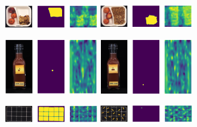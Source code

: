 \begin{figure}[H]
    \captionsetup[subfigure]{justification=centering}
    \centering
    \begin{subfigure}[b]{\textwidth}
        \centering
        \includegraphics[width=0.45\textwidth]{figures/appendix/appendix_main_ensemble/BB/image_prediction_128.png}
        \includegraphics[width=0.45\textwidth]{figures/appendix/appendix_main_ensemble/BB/image_prediction_272.png}

    \end{subfigure}
    \begin{subfigure}[b]{\textwidth}
        \centering
        \includegraphics[width=0.45\textwidth]{figures/appendix/appendix_main_ensemble/JB/image_prediction_268.png}
        \includegraphics[width=0.45\textwidth]{figures/appendix/appendix_main_ensemble/JB/image_prediction_306.png}

    \end{subfigure}
    \begin{subfigure}[b]{\textwidth}
        \centering
        \includegraphics[width=0.45\textwidth]{figures/appendix/appendix_main_ensemble/PP/image_prediction_199.png}
        \includegraphics[width=0.45\textwidth]{figures/appendix/appendix_main_ensemble/PP/image_prediction_308.png}


\end{subfigure}
\end{figure}
